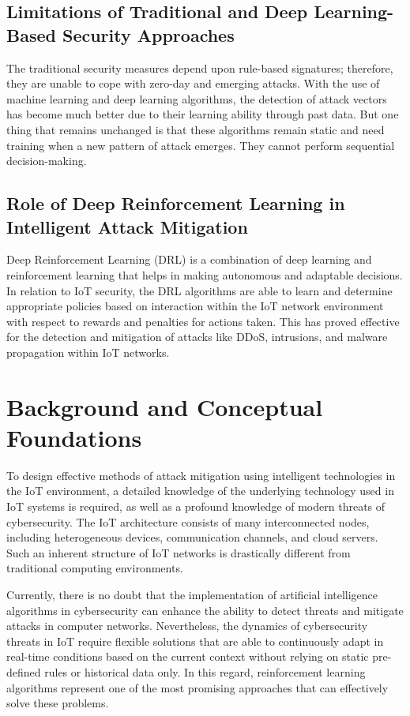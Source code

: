 \documentclass[12pt]{article}
\begin{document}
    \subsection{Limitations of Traditional and Deep Learning-Based Security Approaches}
    The traditional security measures depend upon rule-based signatures; therefore, they are unable to cope with zero-day and emerging attacks. With the use of machine learning and deep learning algorithms, the detection of attack vectors has become much better due to their learning ability through past data. But one thing that remains unchanged is that these algorithms remain static and need training when a new pattern of attack emerges. They cannot perform sequential decision-making.
    \subsection{Role of Deep Reinforcement Learning in Intelligent Attack Mitigation}
    Deep Reinforcement Learning (DRL) \cite{Asad}is a combination of deep learning and reinforcement learning that helps in making autonomous and adaptable decisions. In relation to IoT security, the DRL algorithms are able to learn and determine appropriate policies based on interaction within the IoT network environment with respect to rewards and penalties for actions taken. This has proved effective for the detection and mitigation of attacks like DDoS, intrusions, and malware propagation within IoT networks.

	\section{Background and Conceptual Foundations}
	To design effective methods of attack mitigation using intelligent technologies in the IoT environment, a detailed knowledge of the underlying technology used in IoT systems is required, as well as a profound knowledge of modern threats of cybersecurity. The IoT architecture consists of many interconnected nodes, including heterogeneous devices, communication channels, and cloud servers. Such an inherent structure of IoT networks is drastically different from traditional computing environments.

Currently, there is no doubt that the implementation of artificial intelligence algorithms in cybersecurity can enhance the ability to detect threats and mitigate attacks in computer networks. Nevertheless, the dynamics of cybersecurity threats in IoT require flexible solutions that are able to continuously adapt in real-time conditions based on the current context without relying on static pre-defined rules or historical data only. In this regard, reinforcement learning algorithms represent one of the most promising approaches that can effectively solve these problems.
\end{document}

